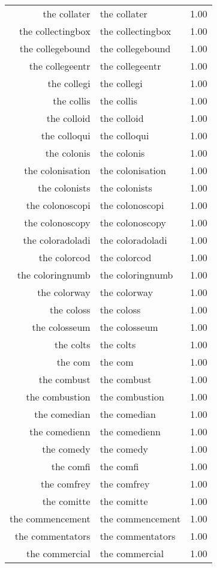\begin{table}[ht]
\begin{tabular}{rlr}
  the collater & the collater & 1.00 \\ 
  the collectingbox & the collectingbox & 1.00 \\ 
  the collegebound & the collegebound & 1.00 \\ 
  the collegeentr & the collegeentr & 1.00 \\ 
  the collegi & the collegi & 1.00 \\ 
  the collis & the collis & 1.00 \\ 
  the colloid & the colloid & 1.00 \\ 
  the colloqui & the colloqui & 1.00 \\ 
  the colonis & the colonis & 1.00 \\ 
  the colonisation & the colonisation & 1.00 \\ 
  the colonists & the colonists & 1.00 \\ 
  the colonoscopi & the colonoscopi & 1.00 \\ 
  the colonoscopy & the colonoscopy & 1.00 \\ 
  the coloradoladi & the coloradoladi & 1.00 \\ 
  the colorcod & the colorcod & 1.00 \\ 
  the coloringnumb & the coloringnumb & 1.00 \\ 
  the colorway & the colorway & 1.00 \\ 
  the coloss & the coloss & 1.00 \\ 
  the colosseum & the colosseum & 1.00 \\ 
  the colts & the colts & 1.00 \\ 
  the com & the com & 1.00 \\ 
  the combust & the combust & 1.00 \\ 
  the combustion & the combustion & 1.00 \\ 
  the comedian & the comedian & 1.00 \\ 
  the comedienn & the comedienn & 1.00 \\ 
  the comedy & the comedy & 1.00 \\ 
  the comfi & the comfi & 1.00 \\ 
  the comfrey & the comfrey & 1.00 \\ 
  the comitte & the comitte & 1.00 \\ 
  the commencement & the commencement & 1.00 \\ 
  the commentators & the commentators & 1.00 \\ 
  the commercial & the commercial & 1.00 \\ 

\end{tabular}
\end{table}
